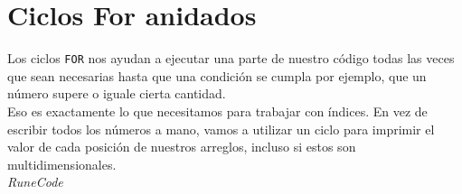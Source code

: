 \documentclass{article}
\begin{document}
\section{Ciclos For anidados}%
Los ciclos \texttt{FOR} nos ayudan a ejecutar una parte de nuestro código todas
las veces que sean necesarias hasta que una condición se cumpla por ejemplo,
que un número supere o iguale cierta cantidad.\\

Eso es exactamente lo que necesitamos para trabajar con índices. En vez de
escribir todos los números a mano, vamos a utilizar un ciclo para imprimir el
valor de cada posición de nuestros arreglos, incluso si estos son
multidimensionales.\\






















\vspace{2cm}
\LARGE\textit{RuneCode}
\end{document}
